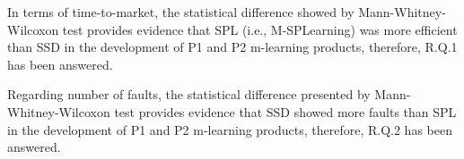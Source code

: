 \begin{table}
\end{table}

In terms of time-to-market, the statistical difference showed by Mann-Whitney-Wilcoxon test provides evidence that SPL (i.e., M-SPLear\allowbreak ning) was more efficient than SSD in the development of P1 and P2 m-learning products, therefore, R.Q.1 has been answered.

Regarding number of faults, the statistical difference presented by Mann-Whitney-Wilcoxon test provides evidence that SSD showed more faults than SPL in the development of P1 and P2 m-learning products, therefore, R.Q.2 has been answered.


